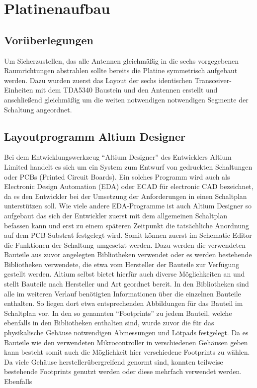 \chapter{Platinenaufbau}
\label{sec:Platinenaufbau}
\pagestyle{scrheadings}

\section{Vorüberlegungen}
Um Sicherzustellen, das alle Antennen gleichmäßig in die sechs vorgegebenen Raumrichtungen abstrahlen sollte bereits die Platine symmetrisch aufgebaut werden. Dazu wurden zuerst das Layout der sechs identischen Transceiver-Einheiten mit dem TDA5340 Baustein und den Antennen erstellt und anschließend gleichmäßig um die weiten notwendigen notwendigen Segmente der Schaltung angeordnet. 
\section{Layoutprogramm Altium Designer}
Bei dem Entwicklungswerkzeug \enquote{Altium Designer} des Entwicklers Altium Limited handelt es sich um ein System zum Entwurf von  gedruckten  Schaltungen oder PCBs (Printed Circuit Boards). Ein solches Programm wird auch als Electronic Design Automation (EDA) oder ECAD für electronic CAD bezeichnet, da es den Entwickler bei der Umsetzung der Anforderungen in einen Schaltplan unterstützen soll.
Wie viele andere EDA-Programme ist auch Altium Designer so aufgebaut das sich der Entwickler zuerst mit dem allgemeinen Schaltplan befassen kann und erst zu einem späteren Zeitpunkt die tatsächliche Anordnung auf dem PCB-Substrat festgelegt wird. Somit können zuerst im Schematic Editor die Funktionen der Schaltung umgesetzt werden. Dazu werden die verwendeten Bauteile aus zuvor angelegten Bibliotheken verwendet oder es werden bestehende Bibliotheken verwendete, die etwa vom Hersteller der Bauteile zur Verfügung gestellt werden. Altium selbst bietet hierfür auch diverse Möglichkeiten an und stellt Bauteile nach Hersteller und Art geordnet bereit.
In den Bibliotheken sind alle im weiteren Verlauf benötigten Informationen über die einzelnen Bauteile enthalten. So liegen dort etwa  entsprechenden Abbildungen für das Bauteil im  Schaltplan  vor. In den so genannten \enquote{Footprints} zu jedem Bauteil, welche ebenfalls in den Bibliotheken enthalten sind, wurde zuvor die für das physikalische Gehäuse notwendigen Abmessungen und Lötpads festgelegt. Da es Bauteile wie den verwendeten  Mikrocontroller in verschiedenen Gehäusen geben kann besteht somit auch die Möglichkeit hier verschiedene Footprints zu wählen. Da viele Gehäuse herstellerübergreifend genormt sind, konnten teilweise bestehende Footprints genutzt werden oder diese mehrfach verwendet werden.
Ebenfalls 

